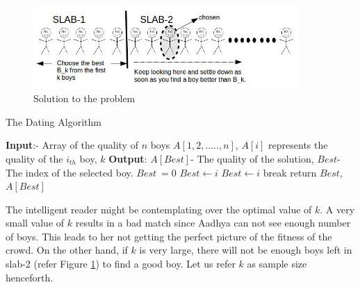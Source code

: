 \documentclass{book}
\begin{document}
\begin{figure}[h!]
\centering
\includegraphics[width=0.9\textwidth]{boys.jpg}
\caption{Solution to the problem}
\label{boy}
\end{figure}

\begin{algorithm}[h!]
\caption{The Dating Algorithm}\label{dating}
\begin{algorithmic}[1]
\State \textbf{Input}:- Array of the quality of $n$ boys $A[1,2,.....,n]$, $A[i]$ represents the quality of the $i_{th}$ boy, $k$
\State \textbf{Output}: $A[Best]$- The quality of the solution, $Best$- The index of the selected boy.
\State $Best\ = 0$
\State $Best \gets i $
\EndIf
\EndFor
{}
\State $Best \gets i$
\State break
\EndIf
\EndFor
\State return $Best$, $A[Best]$
\EndProcedure
\end{algorithmic}
\end{algorithm}



The intelligent reader might be contemplating over the optimal value of $k$. A very small value of $k$ results in a bad match since Aadhya can not see enough number of boys. This leads to her not getting the perfect picture of the fitness of the crowd. On the other hand, if $k$ is very large, there will not be enough boys left in slab-2 (refer Figure \ref{boy}) to find a good boy. Let us refer $k$ as sample size henceforth. 
\end{document}
